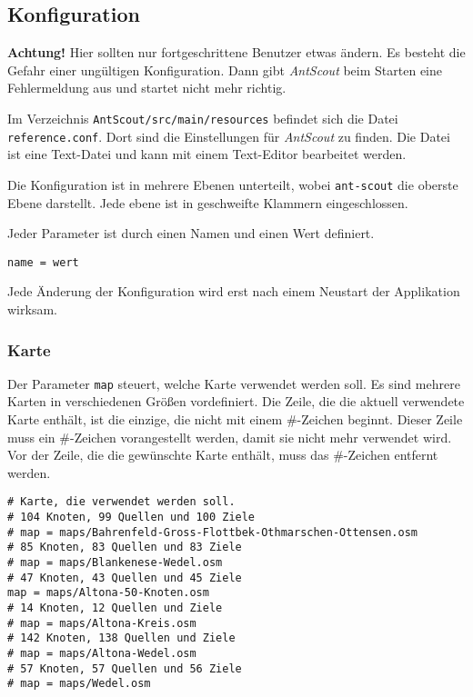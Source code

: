 \documentclass[a4paper,10pt]{scrreprt}
\begin{document}
\subsection{Konfiguration}
\label{sec:konfiguration}

\textbf{Achtung!}
Hier sollten nur fortgeschrittene Benutzer etwas ändern.
Es besteht die Gefahr einer ungültigen Konfiguration.
Dann gibt \textit{AntScout} beim Starten eine Fehlermeldung aus und startet nicht mehr richtig.

Im Verzeichnis \texttt{AntScout/src/main/resources} befindet sich die Datei \texttt{reference.conf}.
Dort sind die Einstellungen für \textit{AntScout} zu finden.
Die Datei ist eine Text-Datei und kann mit einem Text-Editor bearbeitet werden.

Die Konfiguration ist in mehrere Ebenen unterteilt, wobei \texttt{ant-scout} die oberste Ebene darstellt.
Jede ebene ist in geschweifte Klammern eingeschlossen.

Jeder Parameter ist durch einen Namen und einen Wert definiert.

\begin{lstlisting}
name = wert
\end{lstlisting}

Jede Änderung der Konfiguration wird erst nach einem Neustart der Applikation wirksam.

\subsubsection{Karte}
\label{sec:karte}

Der Parameter \texttt{map} steuert, welche Karte verwendet werden soll.
Es sind mehrere Karten in verschiedenen Größen vordefiniert.
Die Zeile, die die aktuell verwendete Karte enthält, ist die einzige, die nicht mit einem \#-Zeichen beginnt.
Dieser Zeile muss ein \#-Zeichen vorangestellt werden, damit sie nicht mehr verwendet wird.
Vor der Zeile, die die gewünschte Karte enthält, muss das \#-Zeichen entfernt werden.

\begin{lstlisting}
# Karte, die verwendet werden soll.
# 104 Knoten, 99 Quellen und 100 Ziele
# map = maps/Bahrenfeld-Gross-Flottbek-Othmarschen-Ottensen.osm
# 85 Knoten, 83 Quellen und 83 Ziele
# map = maps/Blankenese-Wedel.osm
# 47 Knoten, 43 Quellen und 45 Ziele
map = maps/Altona-50-Knoten.osm
# 14 Knoten, 12 Quellen und Ziele
# map = maps/Altona-Kreis.osm
# 142 Knoten, 138 Quellen und Ziele
# map = maps/Altona-Wedel.osm
# 57 Knoten, 57 Quellen und 56 Ziele
# map = maps/Wedel.osm
\end{lstlisting}
\end{document}
